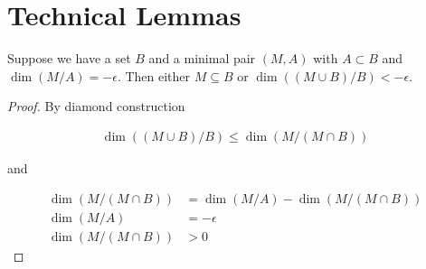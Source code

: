 \documentclass{amsart}
\begin{document}






%
%
%
%

\section{Technical Lemmas}

\begin{Lemma}
	Suppose we have a set $B$ and a minimal pair $(M, A)$ with $A \subset B$ and $\dim(M/A) = -\epsilon$.
Then either $M \subseteq B$ or $\dim((M \cup B)/B) < -\epsilon$.
\end{Lemma}

\begin{proof}
	By diamond construction

	\begin{align*}
		\dim((M \cup B)/B) \leq \dim(M / (M \cap B))
	\end{align*}

	and 

	\begin{align*}
		\dim(M / (M \cap B)) &= \dim (M/A) - \dim(M / (M \cap B)) \\
		\dim (M/A) &= -\epsilon \\
		\dim(M / (M \cap B)) &> 0
	\end{align*}
\end{proof}
\end{document}
